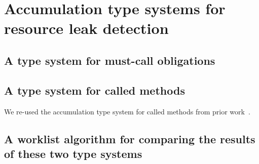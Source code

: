 
\section{Accumulation type systems for resource leak detection}
\label{sec:base-type-systems}

\subsection{A type system for must-call obligations}
\label{sec:must-call}

\subsection{A type system for called methods}
\label{sec:called-methods}

We re-used the accumulation type system for called methods from
prior work~\cite{kellogg20verifying}. 

\subsection{A worklist algorithm for comparing the results of these two type systems}
\label{sec:must-call-invoked}


